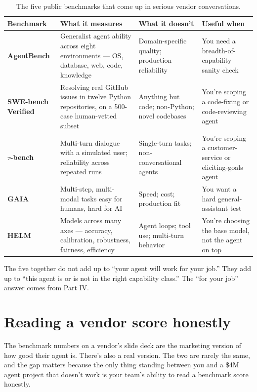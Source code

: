\begin{table}[tb]
\centering
\small
\begin{tabularx}{\textwidth}{@{}p{}XXX@{}}
\toprule
\textbf{Benchmark} & \textbf{What it measures} & \textbf{What it doesn't} & \textbf{Useful when} \\
\midrule
\textbf{AgentBench} \citep{liu2023agentbench} & Generalist agent ability across eight environments --- OS, database, web, code, knowledge & Domain-specific quality; production reliability & You need a breadth-of-capability sanity check \\
\addlinespace
\textbf{SWE-bench Verified} \citep{jimenez2024swebench,openai-swebench-verified-2024} & Resolving real GitHub issues in twelve Python repositories, on a 500-case human-vetted subset & Anything but code; non-Python; novel codebases & You're scoping a code-fixing or code-reviewing agent \\
\addlinespace
\textbf{$\tau$-bench} \citep{yao2024taubench} & Multi-turn dialogue with a simulated user; reliability across repeated runs & Single-turn tasks; non-conversational agents & You're scoping a customer-service or eliciting-goals agent \\
\addlinespace
\textbf{GAIA} \citep{mialon2023gaia} & Multi-step, multi-modal tasks easy for humans, hard for AI & Speed; cost; production fit & You want a hard general-assistant test \\
\addlinespace
\textbf{HELM} \citep{liang2022helm} & Models across many axes --- accuracy, calibration, robustness, fairness, efficiency & Agent loops; tool use; multi-turn behavior & You're choosing the base model, not the agent on top \\
\bottomrule
\end{tabularx}
\caption{The five public benchmarks that come up in serious vendor conversations.}
\end{table}

The five together do not add up to ``your agent will work for your job.'' They add up to ``this agent is or is not in the right capability class.'' The ``for your job'' answer comes from Part IV.

\section{Reading a vendor score honestly}

The benchmark numbers on a vendor's slide deck are the marketing version of how good their agent is. There's also a real version. The two are rarely the same, and the gap matters because the only thing standing between you and a \$4M agent project that doesn't work is your team's ability to read a benchmark score honestly.

